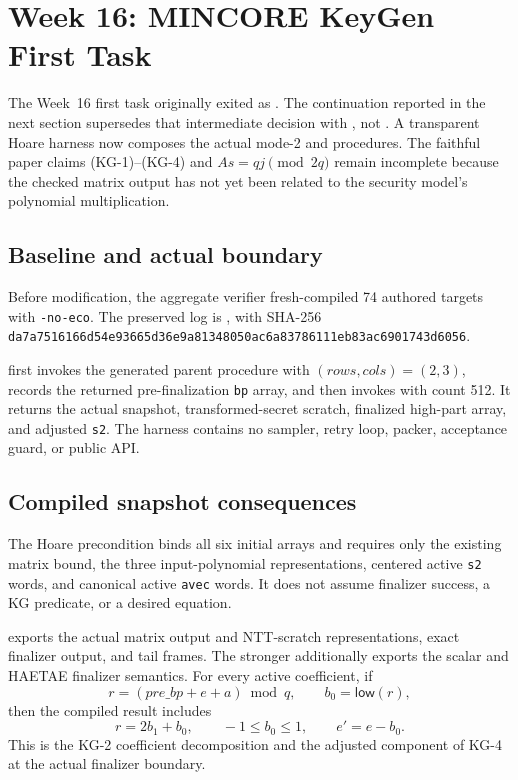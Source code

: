 \section{Week 16: MINCORE KeyGen First Task}

The Week~16 first task originally exited as
.  The continuation reported in the
next section supersedes that intermediate decision with
, not .  A transparent
Hoare harness now composes the actual mode-2
 and  procedures.
The faithful paper claims (KG-1)--(KG-4) and
\(A s = q j \pmod {2q}\) remain incomplete because the checked matrix output
has not yet been related to the security model's polynomial multiplication.

\subsection*{Baseline and actual boundary}

Before modification, the aggregate verifier fresh-compiled 74 authored
targets with \texttt{-no-eco}.  The preserved log is
, with SHA-256
\texttt{da7a7516166d54e93665d36e9a81348050ac6a83786111eb83ac6901743d6056}.

first invokes the generated parent procedure  with
\((\mathit{rows},\mathit{cols})=(2,3)\), records the returned
pre-finalization \texttt{bp} array, and then invokes
 with count 512.  It returns the actual
snapshot, transformed-secret scratch, finalized high-part array, and adjusted
\texttt{s2}.  The harness contains no sampler, retry loop, packer, acceptance
guard, or public API.

\subsection*{Compiled snapshot consequences}

The Hoare precondition binds all six initial arrays and requires only the
existing matrix bound, the three input-polynomial representations, centered
active \texttt{s2} words, and canonical active \texttt{avec} words.  It does
not assume finalizer success, a KG predicate, or a desired equation.

 exports the actual matrix
output and NTT-scratch representations, exact finalizer output, and tail
frames.  The stronger
 additionally exports
the scalar and HAETAE finalizer semantics.  For every active coefficient, if
\[
 r=(\mathit{pre\_bp}+e+a)\bmod q,
 \qquad b_0=\mathsf{low}(r),
\]
then the compiled result includes
\[
 r=2b_1+b_0,\qquad -1\leq b_0\leq1,
 \qquad e'=e-b_0.
\]
This is the KG-2 coefficient decomposition and the adjusted component of
KG-4 at the actual finalizer boundary.

